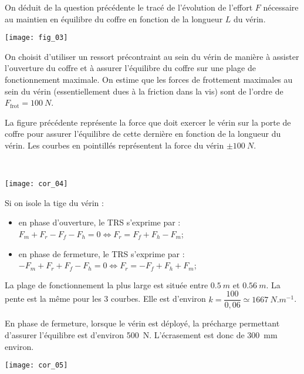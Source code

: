On déduit de la question précédente le tracé de l’évolution de l’effort $F$ nécessaire au maintien en équilibre du coffre en fonction de la longueur $L$ du vérin.


\begin{marginfigure}
\texttt{[image: fig\_03]}
\end{marginfigure}

On choisit d’utiliser un ressort précontraint au sein du vérin de manière à assister l’ouverture du coffre et à assurer l’équilibre du coffre sur une plage de fonctionnement maximale. On estime que les forces de frottement maximales au sein du vérin (essentiellement dues à la friction dans la vis) sont de l’ordre de $F_{\text{frot}}=\SI{100}{N}$. 

La figure précédente représente la force que doit exercer le vérin sur la porte de coffre pour assurer l’équilibre de cette dernière en fonction de la longueur du vérin. Les courbes en pointillés représentent la force du vérin $\pm\SI{100}{N}$.
\fi




\ifprof
\begin{corrige}~\\

\begin{center}
\texttt{[image: cor\_04]}
\end{center}

Si on isole la tige du vérin :
\begin{itemize}
\item en phase d'ouverture, le TRS s'exprime par : $F_m + F_r - F_f - F_h =0\Leftrightarrow F_r = F_f + F_h - F_m$; 
\item en phase de fermeture, le TRS s'exprime par : $-F_m + F_r + F_f - F_h =0 \Leftrightarrow F_r = -F_f + F_h + F_m$;
\end{itemize}





La plage de fonctionnement la plus large est située entre $\SI{0,5}{m}$ et $\SI{0,56}{m}$. La pente est la même pour les 3 courbes. Elle est d'environ $k=\dfrac{100}{0,06}\simeq \SI{1667}{N.m^{-1}}$.

En phase de fermeture, lorsque le vérin est déployé, la précharge permettant d'assurer l'équilibre est d'environ \SI{500}{N}.  L'écrasement est donc  de \SI{300}{mm} environ.

\end{corrige}
\begin{center}
\texttt{[image: cor\_05]}
\end{center}
\else
\fi


